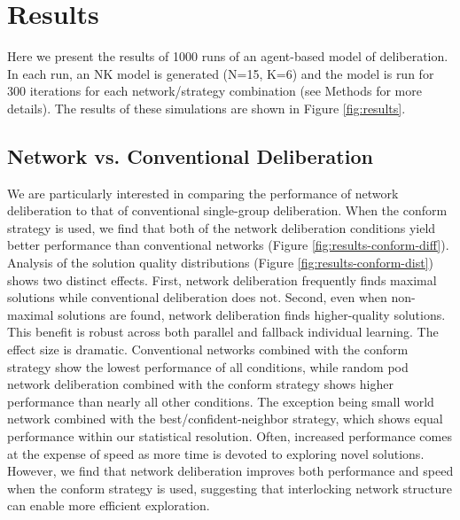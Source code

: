 \documentclass[twocolumn,10pt]{article}
\begin{document}
\section{Results}
Here we present the results of 1000 runs of an agent-based model of deliberation. In each run, an NK model is generated (N=15, K=6) and the model is run for 300 iterations for each network/strategy combination (see Methods for more details). The results of these simulations are shown in Figure \ref{fig:results}.

\subsection{Network vs. Conventional Deliberation}
We are particularly interested in comparing the performance of network deliberation to that of conventional single-group deliberation. When the conform strategy is used, we find that both of the network deliberation conditions yield better performance than conventional networks (Figure \ref{fig:results-conform-diff}). Analysis of the solution quality distributions (Figure \ref{fig:results-conform-dist}) shows two distinct effects. First, network deliberation frequently finds maximal solutions while conventional deliberation does not. Second, even when non-maximal solutions are found, network deliberation finds higher-quality solutions. This benefit is robust across both parallel and fallback individual learning. The effect size is dramatic. Conventional networks combined with the conform strategy show the lowest performance of all conditions, while random pod network deliberation combined with the conform strategy shows higher performance than nearly all other conditions. The exception being small world network combined with the best/confident-neighbor strategy, which shows equal performance within our statistical resolution. 
Often, increased performance comes at the expense of speed as more time is devoted to exploring novel solutions. However, we find that network deliberation improves both performance and speed when the conform strategy is used, suggesting that interlocking network structure can enable more efficient exploration.
\end{document}
